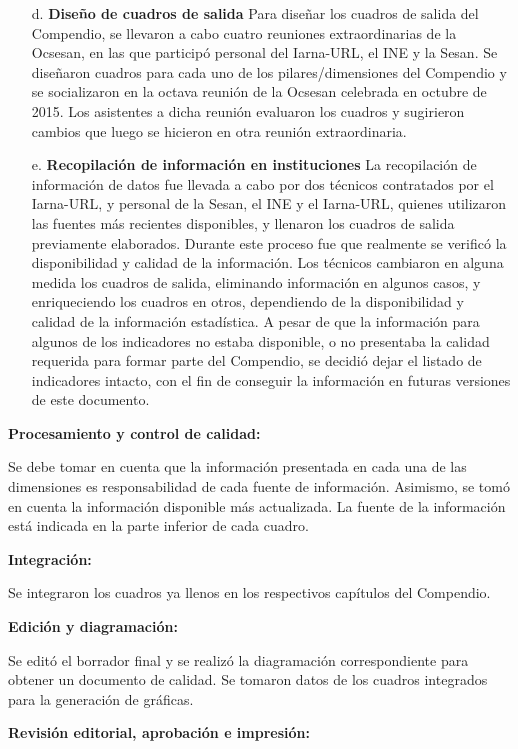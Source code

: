 \begin{itemize}
\item[d.]	\textbf{Diseño de cuadros de salida} Para diseñar los cuadros de salida del Compendio, se llevaron a cabo cuatro reuniones extraordinarias de la Ocsesan, en las que participó personal del Iarna-URL, el INE y la Sesan. Se diseñaron cuadros para cada uno de los pilares/dimensiones del Compendio y se socializaron en la octava reunión de la Ocsesan celebrada en octubre de 2015. Los asistentes a dicha reunión evaluaron los cuadros y sugirieron cambios que luego se hicieron en otra reunión extraordinaria.

\item[e.]	\textbf{Recopilación de información en instituciones} La recopilación de información de datos fue llevada a cabo por dos técnicos contratados por el Iarna-URL, y personal de la Sesan, el INE y el Iarna-URL, quienes utilizaron las fuentes más recientes disponibles, y llenaron los cuadros de salida previamente elaborados. Durante este proceso fue que realmente se verificó la disponibilidad y calidad de la información. Los técnicos cambiaron en alguna medida los cuadros de salida, eliminando información en algunos casos, y enriqueciendo los cuadros en otros, dependiendo de la disponibilidad y calidad de la información estadística. A pesar de que la información para algunos de los indicadores no estaba disponible, o no presentaba la calidad requerida para formar parte del Compendio, se decidió dejar el listado de indicadores intacto, con el fin de conseguir la información en futuras versiones de este documento.
\end{itemize}


\noindent\textbf{Procesamiento y control de calidad:}

Se debe tomar en cuenta que la información presentada en cada una de las dimensiones es responsabilidad de cada fuente de información. Asimismo, se tomó en cuenta la información disponible más actualizada. La fuente de la información está indicada en la parte inferior de cada cuadro. 

\noindent\textbf{Integración:}

Se integraron los cuadros ya llenos en los respectivos capítulos del Compendio. 

\noindent\textbf{Edición y diagramación:}


Se editó el borrador final y se realizó la diagramación correspondiente para obtener un documento de calidad. Se tomaron datos de los cuadros integrados para la generación de gráficas.

\noindent\textbf{Revisión editorial, aprobación e impresión:}

